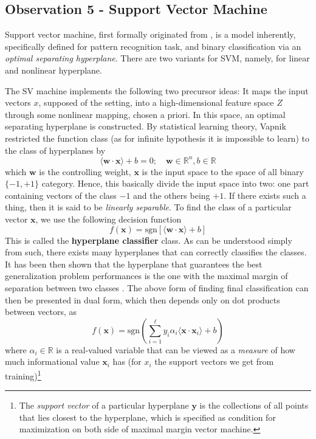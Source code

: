 \documentclass{article}
\begin{document}
\clearpage

\subsection{Observation 5 - Support Vector Machine}

Support vector machine, first formally originated from \cite{Vapnik1999-VAPTNO}, is a model inherently, specifically defined for pattern recognition task, and binary classification via an \textit{optimal separating hyperplane}. There are two variants for SVM, namely, for linear and nonlinear hyperplane. 

The SV machine implements the following two precursor ideas: It maps the input vectors $x$, supposed of the setting, into a high-dimensional feature space $Z$ through some nonlinear mapping, chosen a priori. In this space, an optimal separating hyperplane is constructed. By statistical learning theory, Vapnik restricted the function class (as for infinite hypothesis it is impossible to learn) to the class of hyperplanes by 
\begin{equation}
    \langle \mathbf{w}\cdot \mathbf{x} \rangle + b = 0 ; \quad \mathbf{w}\in \mathbb{R}^{n} , b\in \mathbb{R}
\end{equation}
which $\mathbf{w}$ is the controlling weight, $\mathbf{x}$ is the input space to the space of all binary $\{-1,+1\}$ category. Hence, this basically divide the input space into two: one part containing vectors of the class $-1$ and the others being $+1$. If there exists such a thing, then it is said to be \textit{linearly separable}. To find the class of a particular vector $\mathbf{x}$, we use the following decision function 
\begin{equation}
    f(\mathbf{x}) = \mathrm{sgn}[\langle \mathbf{w}\cdot \mathbf{x}\rangle+ b]
\end{equation}
This is called the \textbf{hyperplane classifier} class. As can be understood simply from such, there exists many hyperplanes that can correctly classifies the classes. It has been then shown that the hyperplane that guarantees the best generalization problem performances is the one with the maximal margin of separation between two classes \cite{Cristianini2000AnIT}. The above form of finding final classification can then be presented in dual form, which then depends only on dot products between vectors, as 
\begin{equation}
    f(\mathbf{x}) = \mathrm{sgn}\left(\sum^{\ell}_{i=1} y_{i}\alpha_{i} \langle \mathbf{x}\cdot \mathbf{x}_{i} \rangle+ b\right)
\end{equation} where $\alpha_{i}\in \mathbb{R}$ is a real-valued variable that can be viewed as a \textit{measure} of how much informational value $\mathbf{x}_{i}$ has (for $x_{i}$ the support vectors we get from training)\footnote{The \textit{support vector} of a particular hyperplane $\mathbf{y}$ is the collections of all points that lies closest to the hyperplane, which is specified as condition for maximization on both side of maximal margin vector machine.}
\end{document}
